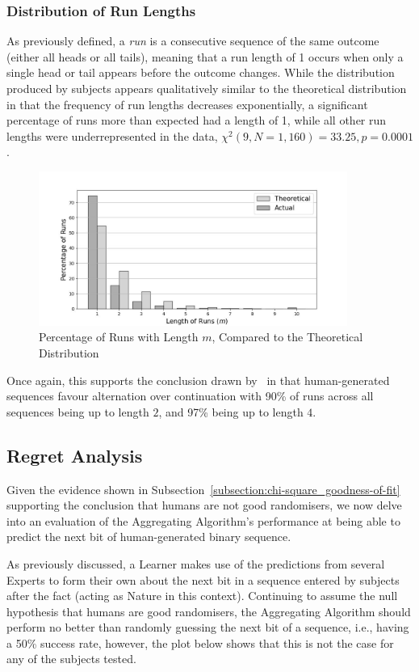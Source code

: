 \subsubsection{Distribution of Run Lengths}
As previously defined, a \textit{run} is a consecutive sequence of the same outcome (either all heads or all tails), meaning that a run length of 1 occurs when only a single head or tail appears before the outcome changes. While the distribution produced by subjects appears qualitatively similar to the theoretical distribution in that the frequency of run lengths decreases exponentially, a significant percentage of runs more than expected had a length of 1, while all other run lengths were underrepresented in the data, $\chi^2(9, N=1,160) = 33.25, p=0.0001$.

\begin{figure}[h]
    \centering
    \includegraphics[width=0.9\textwidth]{images/combined_length_of_runs.jpg}
    \caption{Percentage of Runs with Length $m$, Compared to the Theoretical Distribution}
\end{figure}

Once again, this supports the conclusion drawn by~\cite{bar-hillel:1991} in that human-generated sequences favour alternation over continuation with 90\% of runs across all sequences being up to length $2$, and 97\% being up to length $4$.


\subsection{Regret Analysis}
Given the evidence shown in Subsection~\ref{subsection:chi-square_goodness-of-fit} supporting the conclusion that humans are not good randomisers, we now delve into an evaluation of the Aggregating Algorithm's performance at being able to predict the next bit of human-generated binary sequence.

As previously discussed, a Learner makes use of the predictions from several Experts to form their own about the next bit in a sequence entered by subjects after the fact (acting as Nature in this context). Continuing to assume the null hypothesis that humans are good randomisers, the Aggregating Algorithm should perform no better than randomly guessing the next bit of a sequence, i.e., having a 50\% success rate, however, the plot below shows that this is not the case for any of the subjects tested.

